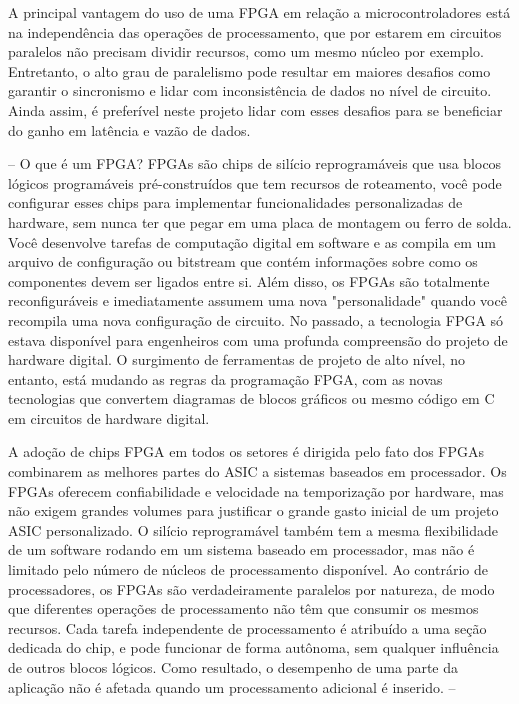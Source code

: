 	A principal vantagem do uso de uma FPGA em relação a microcontroladores está na independência das operações de processamento, que por estarem em circuitos paralelos não precisam dividir recursos, como um mesmo núcleo por exemplo. Entretanto, o alto grau de paralelismo pode resultar em maiores desafios como garantir o sincronismo e lidar com inconsistência de dados no nível de circuito. Ainda assim, é preferível neste projeto lidar com esses desafios para se beneficiar do ganho em latência e vazão de dados.
	
	
	

	--
	 O que é um FPGA?
	 FPGAs são chips de silício reprogramáveis que usa blocos lógicos programáveis pré-construídos que tem recursos de roteamento, você pode configurar esses chips para implementar funcionalidades personalizadas de hardware, sem nunca ter que pegar em uma placa de montagem ou ferro de solda. Você desenvolve tarefas de computação digital em software e as compila em um arquivo de configuração ou bitstream que contém informações sobre como os componentes devem ser ligados entre si. Além disso, os FPGAs são totalmente reconfiguráveis e imediatamente assumem uma nova "personalidade" quando você recompila uma nova configuração de circuito. No passado, a tecnologia FPGA só estava disponível para engenheiros com uma profunda compreensão do projeto de hardware digital. O surgimento de ferramentas de projeto de alto nível, no entanto, está mudando as regras da programação FPGA, com as novas tecnologias que convertem diagramas de blocos gráficos ou mesmo código em C em circuitos de hardware digital.
	 
	 A adoção de chips FPGA em todos os setores é dirigida pelo fato dos FPGAs combinarem as melhores partes do ASIC a sistemas baseados em processador. Os FPGAs oferecem confiabilidade  e velocidade na temporização por hardware, mas não exigem grandes volumes para justificar o grande gasto inicial de um projeto ASIC personalizado. O silício reprogramável também tem a mesma flexibilidade de um software rodando em um sistema baseado em processador, mas não é limitado pelo número de núcleos de processamento disponível. Ao contrário de processadores, os FPGAs são verdadeiramente paralelos por natureza, de modo que diferentes operações de processamento não têm que consumir os mesmos recursos. Cada tarefa independente de processamento é atribuído a uma seção dedicada do chip, e pode funcionar de forma autônoma, sem qualquer influência de outros blocos lógicos. Como resultado, o desempenho de uma parte da aplicação não é afetada quando um processamento adicional é inserido.
	 --
	
